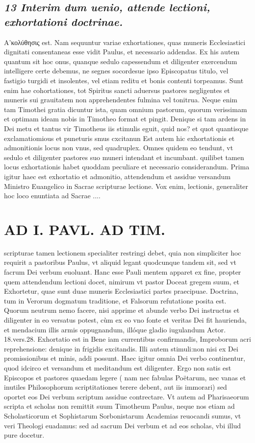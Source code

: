 \documentclass{article}
\begin{document}
\begin{pages}
\subsection*{\textit{13 Interim dum uenio, attende lectioni, exhortationi doctrinae. }}\pstart Α’κολύθησις est. Nam sequuntur variae exhortationes, quas muneris Ecclesiastici dignitati consentaneas esse vidit Paulus, et necessario addendas. Ex his autem quantum sit hoc onus, quanque sedulo capessendum et diligenter exercendum intelligere certe debemus, ne segnes socordesue ipso Episcopatus titulo, vel fastigio turgidi et insolentes, vel etiam reditu et bonis contenti torpeamus. Sunt enim hae cohortationes, tot Spiritus sancti aduersus pastores negligentes et muneris sui grauitatem non apprehendentes fulmina vel tonitrua. Neque enim tam Timothei gratia dicuntur ista, quam omnium pastorum, quorum verissimam et optimam ideam nobis in Timotheo format et pingit. Denique si tam ardens in Dei metu et tantus vir Timotheus iis stimulis eguit, quid nos? et quot quantisque exclamatiomious et puneturis smus cxcitanun Est autem hic exhortationis et admonitionis locus non vnus, sed quadruplex. Omnes quidem eo tendunt, vt sedulo et diligenter pastores suo muneri intendant et incumbant. quilibet tamen locus exhortationis habet quoddam peculiare et necessario considerandum.  \pend\pstart Prima igitur haec est exhortatio et admonitio, attendendum et assidue versandum Ministro Euangelico in Sacrae scripturae lectione. Vox enim, lectionis, generaliter hoc loco enuntiata ad Sacrae ....  \pend
\section*{AD I. PAVL. AD TIM. }
\marginpar{[ p.432 ]}\pstart scripturae tamen lectionem specialiter restringi debet, quia non simpliciter hoc requirit a pastoribus Paulus, vt aliquid legant quodcunque  tandem sit, sed vt facrum Dei verbum euoluant. Hanc esse Pauli mentem apparet ex fine, propter quem attendendum lectioni docet, nimirum vt pastor Doceat gregem suum, et Exhortetur, quae sunt duae muneris Ecclesiastici partes praecipuae. Doctrina, tum in Verorum dogmatum traditione, et Falsorum refutatione posita est. Quorum neutrum nemo facere, nisi apprime et abunde verbo Dei instructus et diligenter in eo versatus potest, cùm ex eo vno fonte et veritas Dei fit haurienda, et mendacium illis armis oppugnandum, illóque gladio iugulandum Actor. 18.vers.28.  \pend\pstart Exhortatio est in Bene iam currentibus confirmandis, Improborum acri reprehensione: denique in frigidis excitandis. Illi autem stimuli:non nisi ex Dei promissionibus et minis, addi possunt. Haec igitur omnia Dei verbo continentur, quod idcirco et versandum et meditandum est diligenter. Ergo non satis est Episcopos et pastores quaedam legere ( nam nec fabulas Poëtarum, nec vanas et inutiles Philosophorum scriptitationes terere debent, aut iis immorari) sed oportet eos Dei verbum scriptum assidue contrectare. Vt autem ad Pharisaeorum scripta et scholas non remittit suum Timotheum Paulus, neque nos etiam ad Scholasticorum et Sophistarum Sorbonistarum Academias reuocandi sumus, vt veri Theologi euadamus: sed ad sacrum Dei verbum et ad eos scholas, vbi illud pure docetur.  \pend

\end{pages}
\end{document}
